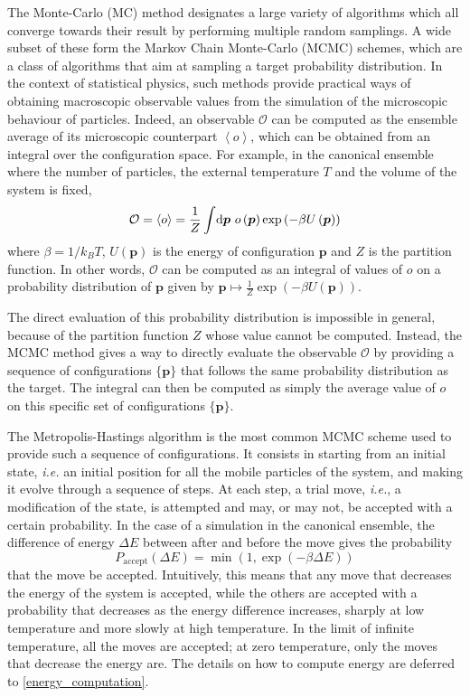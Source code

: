 \documentclass[main.tex]{subfiles}
\begin{document}
The Monte-Carlo (MC) method designates a large variety of algorithms which all converge towards their result by performing multiple random samplings. A wide subset of these form the Markov Chain Monte-Carlo (MCMC) schemes, which are a class of algorithms that aim at sampling a target probability distribution. In the context of statistical physics, such methods provide practical ways of obtaining macroscopic observable values from the simulation of the microscopic behaviour of particles. Indeed, an observable $\mathcal O$ can be computed as the ensemble average of its microscopic counterpart $\left<o\right>$, which can be obtained from an integral over the configuration space. For example, in the canonical ensemble where the number of particles, the external temperature $T$ and the volume of the system is fixed, \[\mathcal O = \left<o\right> = \frac1Z\int\!\text d{\boldsymbol p}\  o\left({\boldsymbol p}\right)\exp\left(-\beta U\left({\boldsymbol p}\right)\right)\label{eq:canonicalensemble}\] where $\beta = 1/k_BT$, $U\left({\boldsymbol p}\right)$ is the energy of configuration $\boldsymbol p$ and $Z$ is the partition function. In other words, $\mathcal O$ can be computed as an integral of values of $o$ on a probability distribution of $\boldsymbol p$ given by $\boldsymbol p\mapsto \frac1Z\exp\left(-\beta U\left({\boldsymbol p}\right)\right)$.

The direct evaluation of this probability distribution is impossible in general, because of the partition function $Z$ whose value cannot be computed. Instead, the MCMC method gives a way to directly evaluate the observable $\mathcal O$ by providing a sequence of configurations $\{\boldsymbol p\}$ that follows the same probability distribution as the target. The integral can then be computed as simply the average value of $o$ on this specific set of configurations $\{\boldsymbol p\}$.

\label{metropolis}

The Metropolis-Hastings algorithm is the most common MCMC scheme used to provide such a sequence of configurations. It consists in starting from an initial state, \textit{i.e.} an initial position for all the mobile particles of the system, and making it evolve through a sequence of steps. At each step, a trial move, \textit{i.e.}, a modification of the state, is attempted and may, or may not, be accepted with a certain probability. In the case of a simulation in the canonical ensemble, the difference of energy $\Delta E$ between after and before the move gives the probability
\[P_\text{accept}(\Delta E) = \min\left(1, \exp\left(-\beta \Delta E\right)\right)\label{eq:MCcanonicalaccept}\]
that the move be accepted. Intuitively, this means that any move that decreases the energy of the system is accepted, while the others are accepted with a probability that decreases as the energy difference increases, sharply at low temperature and more slowly at high temperature. In the limit of infinite temperature, all the moves are accepted; at zero temperature, only the moves that decrease the energy are. The details on how to compute energy are deferred to \cref{energy_computation}.
\end{document}
